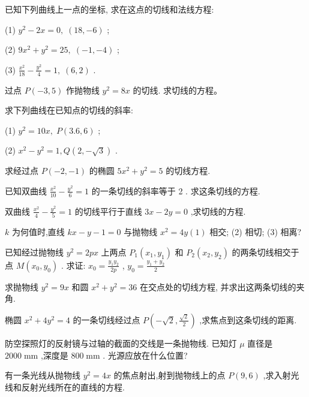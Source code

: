 \documentclass[lang=cn,newtx,12pt,scheme=chinese]{elegantbook}
\begin{document}
\begin{problemset}[练习]

\item 已知下列曲线上一点的坐标, 求在这点的切线和法线方程:

(1) \({y}^{2} - {2x} = 0,\;\left( {{18}, - 6}\right)\) ;

(2) \(9{x}^{2} + {y}^{2} = {25},\;\left( {-1, - 4}\right)\) ;

(3) \(\frac{{x}^{2}}{18} - \frac{{y}^{2}}{4} = 1,\;\left( {6,2}\right)\) .

\item 过点 \(P\left( {-3,5}\right)\) 作抛物线 \({y}^{2} = {8x}\) 的切线. 求切线的方程。

\end{problemset}

\begin{problemset}[习 题 九]

\item 求下列曲线在已知点的切线的斜率:

(1) \({y}^{2} = {10x},\;P\left( {{3.6},6}\right)\) ;

(2) \({x}^{2} - {y}^{2} = 1,Q\left( {2, - \sqrt{3}}\right)\) .

\item 求经过点 \(P\left( {-2, - 1}\right)\) 的椭圆 \(5{x}^{2} + {y}^{2} = 5\) 的切线方程.

\item 已知双曲线 \(\frac{{x}^{2}}{10} - \frac{{y}^{2}}{6} = 1\) 的一条切线的斜率等于 2 . 求这条切线的方程.

\item 双曲线 \(\frac{{x}^{2}}{4} - \frac{{y}^{2}}{5} = 1\) 的切线平行于直线 \({3x} - {2y} = 0\) ,求切线的方程.

\item \(k\) 为何值时,直线 \({kx} - y - 1 = 0\) 与抛物线 \({x}^{2} = {4y}\left( 1\right)\) 相交; (2) 相切; (3) 相离?

\item 已知经过抛物线 \({y}^{2} = {2px}\) 上两点 \({P}_{1}\left( {{x}_{1},{y}_{1}}\right)\) 和 \({P}_{2}\left( {{x}_{2},{y}_{2}}\right)\) 的两条切线相交于点 \(M\left( {{x}_{0},{y}_{0}}\right)\) . 求证: \({x}_{0} = \frac{{y}_{1}{y}_{2}}{2p}\) , \({y}_{0} = \frac{{y}_{1} + {y}_{2}}{2}\)

\item 求抛物线 \({y}^{2} = {9x}\) 和圆 \({x}^{2} + {y}^{2} = {36}\) 在交点处的切线方程, 并求出这两条切线的夹角.

\item 椭圆 \({x}^{2} + 4{y}^{2} = 4\) 的一条切线经过点 \(P\left( {-\sqrt{2},\frac{\sqrt{2}}{2}}\right)\) ,求焦点到这条切线的距离.

\item 防空探照灯的反射镜与过轴的截面的交线是一条抛物线. 已知灯 \(\mu\) 直径是 \({2000}\mathrm{\;{mm}}\) ,深度是 \({800}\mathrm{\;{mm}}\) . 光源应放在什么位置?

\item 有一条光线从抛物线 \({y}^{2} = {4x}\) 的焦点射出,射到抛物线上的点 \(P\left( {9,6}\right)\) ,求入射光线和反射光线所在的直线的方程.
\end{problemset}
\end{document}
